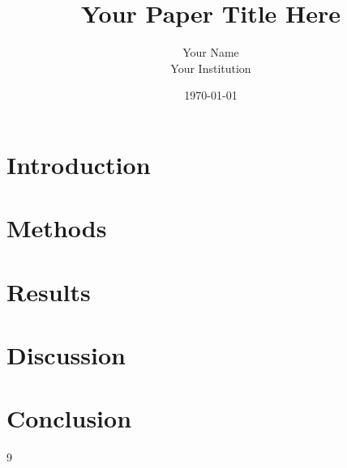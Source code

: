 \documentclass[12pt,a4paper]{article}
\title{Your Paper Title Here}
\author{Your Name \\ Your Institution}
\date{\today}
\begin{document}
\maketitle

\begin{abstract}
\end{abstract}

\tableofcontents
\newpage


\section{Introduction}
\label{sec:intro}

\section{Methods}
\label{sec:methods}

\section{Results}
\label{sec:results}

\section{Discussion}
\label{sec:discussion}

\section{Conclusion}
\label{sec:conclusion}

\begin{thebibliography}{9}
\end{thebibliography}
\end{document}
